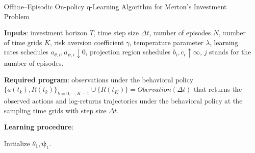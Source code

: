 \begin{algorithm}[htbp]
	\caption{Offline--Episodic On-policy q-Learning Algorithm for Merton's Investment Problem}
	\textbf{Inputs}: investment horizon $T$, time step size $\Delta t$, number of episodes $N$, number of time grids $K$, risk aversion coefficient $\gamma$, temperature parameter $\lambda$, learning rates schedules $a_{\theta,i},a_{\psi,i} \downarrow 0$, projection region schedules $b_i,c_i \uparrow \infty$, $j$ stands for the number of episodes.
	
	
	\textbf{Required program}: observations under the behavioral policy $ \{a(t_k), R(t_{k})\}_{k = 0,\cdots, K-1}\cup \{ R(t_K)\} = \textit{Obervation}(\Delta t)$ that returns the observed actions and log-returns trajectories under the behavioral policy at the sampling time grids with step size $\Delta t$. 
	
	
	\textbf{Learning procedure}:
	\begin{algorithmic}
		\State Initialize $\theta_1,\bm\psi_1$.
		
		\EndFor
	\end{algorithmic}
	\label{algo:offline episodic}
\end{algorithm}



